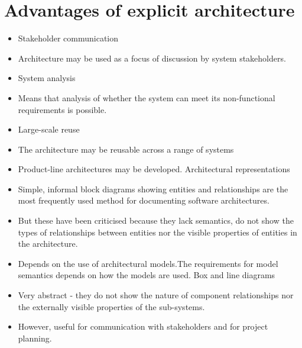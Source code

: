 \section{Advantages of explicit architecture}
\begin{itemize}
\item Stakeholder communication

 \item Architecture may be used as a focus of discussion by system stakeholders.

\item System analysis

 \item Means that analysis of whether the system can meet its non-functional requirements is possible.

\item Large-scale reuse

 \item The architecture may be reusable across a range of systems  \item Product-line architectures may be developed.
Architectural representations

\item Simple, informal block diagrams showing entities and relationships are the most frequently used method for documenting software architectures.

\item But these have been criticised because they lack semantics, do not show the types of relationships between entities nor the visible properties of entities in the architecture.

\item Depends on the use of architectural models.The requirements for model semantics depends on how the models are used.
Box and line diagrams
\item Very abstract - they do not show the nature of component relationships nor the externally visible properties of the sub-systems.

\item However, useful for communication with stakeholders and for project planning.


\end{itemize}
